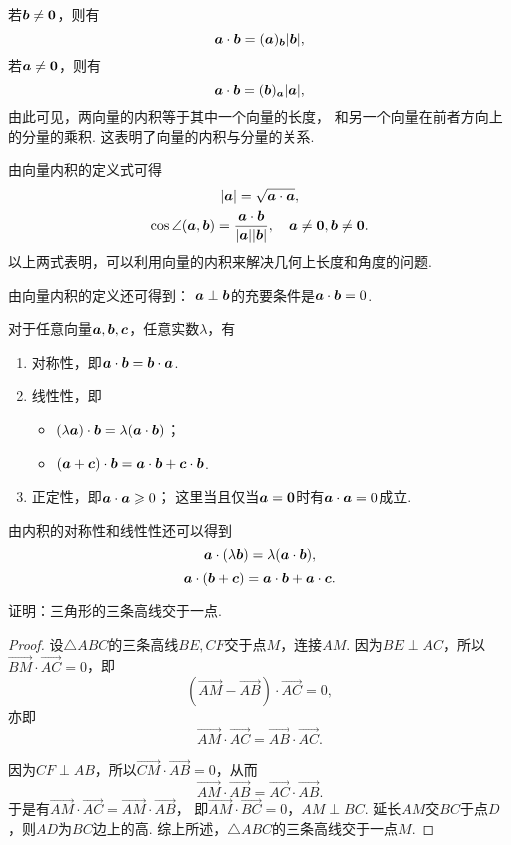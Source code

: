 若\(\boldsymbol{b}\neq\boldsymbol{0}\)，则有
\begin{equation}
	\boldsymbol{a}\cdot\boldsymbol{b}
	= (\boldsymbol{a})_{\boldsymbol{b}} \abs{\boldsymbol{b}},
\end{equation}
若\(\boldsymbol{a}\neq\boldsymbol{0}\)，则有
\begin{equation}
	\boldsymbol{a}\cdot\boldsymbol{b}
	= (\boldsymbol{b})_{\boldsymbol{a}} \abs{\boldsymbol{a}},
\end{equation}
由此可见，两向量的内积等于其中一个向量的长度，
和另一个向量在前者方向上的分量的乘积.
这表明了向量的内积与分量的关系.

由向量内积的定义式可得
\begin{gather}
	\abs{\boldsymbol{a}} = \sqrt{\boldsymbol{a}\cdot\boldsymbol{a}}, \\
	\cos\angle(\boldsymbol{a},\boldsymbol{b}) = \frac{\boldsymbol{a}\cdot\boldsymbol{b}}{\abs{\boldsymbol{a}} \abs{\boldsymbol{b}}},
	\quad \boldsymbol{a}\neq\boldsymbol{0},\boldsymbol{b}\neq\boldsymbol{0}.
\end{gather}
以上两式表明，可以利用向量的内积来解决几何上长度和角度的问题.

由向量内积的定义还可得到：
\(\boldsymbol{a}\perp\boldsymbol{b}\)的充要条件是\(\boldsymbol{a}\cdot\boldsymbol{b}=0\).

\begin{theorem}
对于任意向量\(\boldsymbol{a},\boldsymbol{b},\boldsymbol{c}\)，任意实数\(\lambda\)，有\begin{enumerate}
	\item 对称性，即\(\boldsymbol{a}\cdot\boldsymbol{b} = \boldsymbol{b}\cdot\boldsymbol{a}\).
	\item 线性性，即\begin{itemize}
		\item \((\lambda\boldsymbol{a})\cdot\boldsymbol{b}=\lambda(\boldsymbol{a}\cdot\boldsymbol{b})\)；
		\item \((\boldsymbol{a}+\boldsymbol{c})\cdot\boldsymbol{b}=\boldsymbol{a}\cdot\boldsymbol{b}+\boldsymbol{c}\cdot\boldsymbol{b}\).
	\end{itemize}
	\item 正定性，即\(\boldsymbol{a}\cdot\boldsymbol{a}\geqslant0\)；
	这里当且仅当\(\boldsymbol{a}=\boldsymbol{0}\)时有\(\boldsymbol{a}\cdot\boldsymbol{a}=0\)成立.
\end{enumerate}
\end{theorem}

由内积的对称性和线性性还可以得到\[
	\boldsymbol{a}\cdot(\lambda\boldsymbol{b})=\lambda(\boldsymbol{a}\cdot\boldsymbol{b}),
\]\[
	\boldsymbol{a}\cdot(\boldsymbol{b}+\boldsymbol{c})=\boldsymbol{a}\cdot\boldsymbol{b}+\boldsymbol{a}\cdot\boldsymbol{c}.
\]

\begin{example}
证明：三角形的三条高线交于一点.
\begin{proof}
设\(\triangle ABC\)的三条高线\(BE,CF\)交于点\(M\)，连接\(AM\).
因为\(BE \perp AC\)，所以\(\vec{BM}\cdot\vec{AC}=0\)，即\[
	(\vec{AM}-\vec{AB})\cdot\vec{AC}=0,
\]
亦即\[
	\vec{AM}\cdot\vec{AC}=\vec{AB}\cdot\vec{AC}.
\]

因为\(CF \perp AB\)，所以\(\vec{CM}\cdot\vec{AB}=0\)，从而\[
	\vec{AM}\cdot\vec{AB}=\vec{AC}\cdot\vec{AB}.
\]
于是有\(\vec{AM}\cdot\vec{AC}=\vec{AM}\cdot\vec{AB}\)，
即\(\vec{AM}\cdot\vec{BC}=0\)，\(AM \perp BC\).
延长\(AM\)交\(BC\)于点\(D\)，则\(AD\)为\(BC\)边上的高.
综上所述，\(\triangle ABC\)的三条高线交于一点\(M\).
\end{proof}
\end{example}


